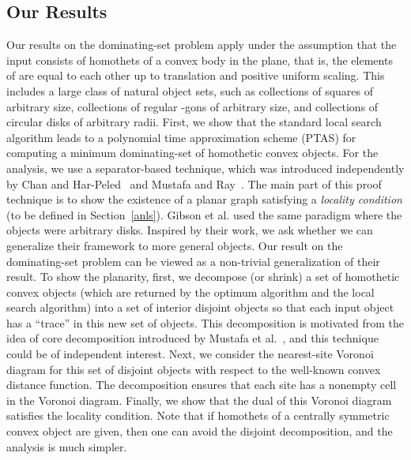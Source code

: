 \documentclass[a4paper,11pt]{article}
\begin{document}
\subsection{Our Results} 
{Our results on the dominating-set problem apply under the assumption that the input consists of homothets of a convex body in the plane, that is, the elements of  are equal to each other up to translation and positive uniform scaling. This includes a large class of natural object sets, such as collections of squares of arbitrary size, collections of regular -gons of arbitrary size, and collections of circular disks of arbitrary radii.}
First, we show that   the standard local search 
algorithm leads to  a  polynomial time approximation scheme (PTAS)  for 
 computing  a minimum  dominating-set 
 of homothetic convex objects. 
For the analysis, we  
use {a} separator-based  technique, which was introduced independently by Chan {and}
Har-Peled~\cite{ChanH09} and  Mustafa  {and} Ray~\cite{MustafaR10}. The main 
part of this proof technique  is to show the existence of a planar graph 
satisfying a \emph{locality 
condition} {(to be defined in Section~\ref{anls})}. Gibson et al. \cite{GibsonP10} used the same paradigm where the 
objects were arbitrary disks. Inspired by their work, we ask whether we can generalize their framework to more general objects.
Our result on {the dominating-set problem} can be viewed as a non-trivial generalization of 
their result. 
To show the planarity, first, we decompose (or shrink) a set of homothetic 
convex 
objects (which are returned by the optimum algorithm and the local search 
algorithm) into a set of interior disjoint  objects so that each input 
object has a ``trace'' in this new set of objects. This
decomposition is motivated from the idea 
of core decomposition  introduced by Mustafa et al.~\cite{Ray}, and 
this technique could be of independent interest. 
Next, we   consider the nearest-site Voronoi diagram for this set of  
disjoint  objects with respect to the well-known convex distance 
function. The decomposition  ensures that each site has a nonempty cell in the  Voronoi diagram. Finally, we 
show that the dual of this Voronoi diagram satisfies the  {locality 
condition}.  Note that if  homothets of a centrally symmetric convex object are given, then one can avoid the disjoint decomposition, and the analysis is much simpler. 
\end{document}
